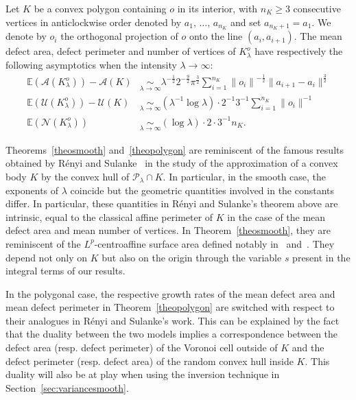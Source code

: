 \documentclass[AHL,Unicode,longabstracts,published]{cedram}
\newcommand{\cA}{\mathcal{A}}
\newcommand{\cN}{\mathcal{N}}
\newcommand{\cP}{\mathcal{P}}
\newcommand{\cU}{\mathcal{U}}
\newcommand{\E}{\mathbb{E}}
\newcommand{\pass}{\vspace{0.3cm}\noindent}
\begin{document}
\begin{theo}\label{theopolygon}
Let $K$ be a convex polygon containing $o$ in its interior, with $n_K\ge 3$ consecutive vertices in anticlockwise order denoted by $a_1,\,\ldots,\,a_{n_K}$ and set $a_{n_K+1}=a_1$. We denote by $o_i$ the orthogonal projection of $o$ onto the line $(a_i,a_{i+1})$. The mean defect area, defect perimeter and number of vertices of $K_{\lambda}^o$ have respectively the following asymptotics when the intensity $\lambda\to\infty:$
\begin{align}
\tag{$\rm i$}\label{theo1.2.i} \E(\cA(K_{\lambda}^o))-\cA(K) &\underset{\lambda\to\infty}{\sim}
 \lambda^{-\frac1{2}}2^{-\frac{9}{2}}\pi^{\frac{3}{2}} \sum_{i=1}^{n_K} {\|o_i\|}^{-\frac1{2}}\|a_{i+1}-a_i\|^{\frac{3}{2}}\\
\tag{$\rm ii$}\label{theo1.2.ii} \E(\cU(K_{\lambda}^o))-\cU(K) &\underset{\lambda\to\infty}{\sim} \left(\lambda^{-1}\log \lambda\right)\cdot 2^{-1} 3^{-1}\sum_{i=1}^{n_K} \|o_i\|^{-1}\\
\tag{$\rm iii$}\label{theo1.2.iii} \E(\cN(K_{\lambda}^o)) &\underset{\lambda\to\infty}{\sim}(\log\lambda)\cdot 2\cdot 3^{-1}n_K.
\end{align}
\end{theo}

Theorems~\ref{theosmooth} and~\ref{theopolygon} are reminiscent of the famous results obtained by R\'enyi and Sulanke~\cite{resu63,resu64} in the study of the approximation of a convex body $K$ by the convex hull of $\cP_\lambda\cap K$. In particular, in the smooth case, the exponents of $\lambda$ coincide but the geometric quantities involved in the constants differ. In particular, these quantities in R\'enyi and Sulanke's theorem above are intrinsic, equal to the classical affine perimeter of $K$ in the case of the mean defect area and mean number of vertices. In Theorem~\ref{theosmooth}, they are reminiscent of the $L^p$-centroaffine surface area defined notably in~\cite{Hug96} and~\cite{Lut96}. They depend not only on $K$ but also on the origin through the variable $s$ present in the integral terms of our results.

In the polygonal case, the respective growth rates of the mean defect area and mean defect perimeter in Theorem~\ref{theopolygon} are switched with respect to their analogues in R\'enyi and Sulanke's work. This can be explained by the fact that the duality between the two models implies a correspondence between the defect area (resp. defect perimeter) of the Voronoi cell outside of $K$ and the defect perimeter (resp. defect area) of the random convex hull inside $K$. This duality will also be at play when using the inversion technique in Section~\ref{sec:variancesmooth}.
\end{document}
